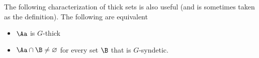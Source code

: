 




\begin{exercise}\label{fact_fip2}
  The following characterization of thick sets is also useful (and is sometimes taken as the definition).
  The following are equivalent
  \begin{itemize}
    \item[1.] $\Aa$ is $G$-thick
    \item[2.] $\Aa\cap\B\neq\varnothing$ for every set $\B$ that is $G$-syndetic.
  \end{itemize}
\end{exercise}

